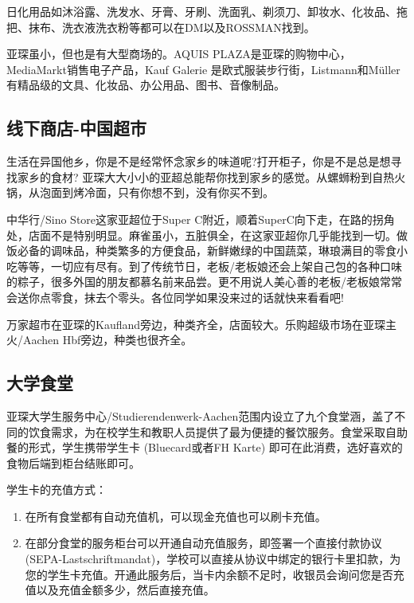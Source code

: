     日化用品如沐浴露、洗发水、牙膏、牙刷、洗面乳、剃须刀、卸妆水、化妆品、拖把、抹布、洗衣液洗衣粉等都可以在DM以及ROSSMAN找到。

    亚琛虽小，但也是有大型商场的。AQUIS PLAZA是亚琛的购物中心，MediaMarkt销售电子产品，Kauf Galerie 是欧式服装步行街，Listmann和Müller有精品级的文具、化妆品、办公用品、图书、音像制品。

  \subsection{线下商店-中国超市}

    生活在异国他乡，你是不是经常怀念家乡的味道呢?打开柜子，你是不是总是想寻找家乡的食材? 亚琛大大小小的亚超总能帮你找到家乡的感觉。从螺蛳粉到自热火锅，从泡面到烤冷面，只有你想不到，没有你买不到。

    中华行/Sino Store这家亚超位于Super C附近，顺着SuperC向下走，在路的拐角处，店面不是特别明显。麻雀虽小，五脏俱全，在这家亚超你几乎能找到一切。做饭必备的调味品，种类繁多的方便食品，新鲜嫩绿的中国蔬菜，琳琅满目的零食小吃等等，一切应有尽有。到了传统节日，老板/老板娘还会上架自己包的各种口味的粽子，很多外国的朋友都慕名前来品尝。更不用说人美心善的老板/老板娘常常会送你点零食，抹去个零头。各位同学如果没来过的话就快来看看吧!

    万家超市在亚琛的Kaufland旁边，种类齐全，店面较大。乐购超级市场在亚琛主火/Aachen Hbf旁边，种类也很齐全。

  \subsection{大学食堂}

    亚琛大学生服务中心/Studierendenwerk-Aachen范围内设立了九个食堂涵，盖了不同的饮食需求，为在校学生和教职人员提供了最为便捷的餐饮服务。食堂采取自助餐的形式，学生携带学生卡 (Bluecard或者FH Karte) 即可在此消费，选好喜欢的食物后端到柜台结账即可。

    学生卡的充值方式：

    \begin{enumerate}
      \item 在所有食堂都有自动充值机，可以现金充值也可以刷卡充值。
      \item 在部分食堂的服务柜台可以开通自动充值服务，即签署一个直接付款协议 (SEPA-Lastschriftmandat)，学校可以直接从协议中绑定的银行卡里扣款，为您的学生卡充值。开通此服务后，当卡内余额不足时，收银员会询问您是否充值以及充值金额多少，然后直接充值。
    \end{enumerate}

